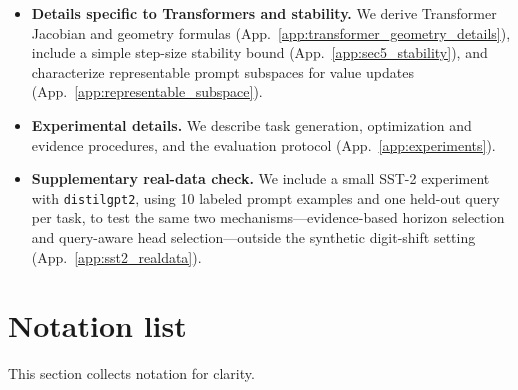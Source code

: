 \documentclass{article}
\theoremstyle{plain}
\theoremstyle{definition}
\theoremstyle{remark}
\begin{document}
\begin{itemize}[leftmargin=*, itemsep=1pt, parsep=0pt, topsep=2pt]
\item \textbf{Details specific to Transformers and stability.}
We derive Transformer Jacobian and geometry formulas (App.~\ref{app:transformer_geometry_details}), include a simple step-size
stability bound (App.~\ref{app:sec5_stability}), and characterize representable prompt subspaces for value updates
(App.~\ref{app:representable_subspace}).

\item \textbf{Experimental details.}
We describe task generation, optimization and evidence procedures, and the evaluation protocol (App.~\ref{app:experiments}).

\item \textbf{Supplementary real-data check.}
We include a small SST-2 experiment with \texttt{distilgpt2}, using 10 labeled prompt examples and one held-out query per task, to test the same two mechanisms---evidence-based horizon selection and query-aware head selection---outside the synthetic digit-shift setting (App.~\ref{app:sst2_realdata}).
\end{itemize}


\section{Notation list}\label{app:notation_list}
This section collects notation for clarity.
\end{document}
